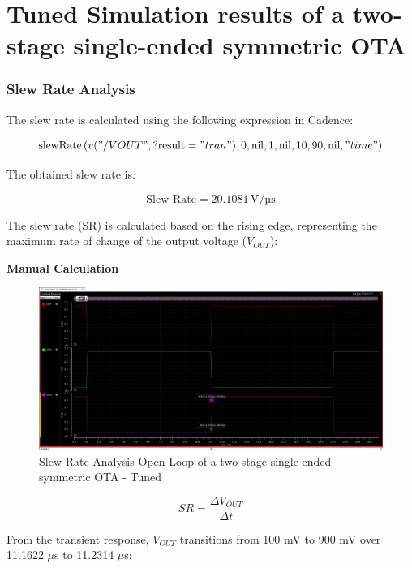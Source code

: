 \chapter{ Tuned Simulation results of a two-stage single-ended symmetric OTA}
\label{ch:chap}


\subsection{Slew Rate Analysis }
The slew rate is calculated using the following expression in Cadence:


\begin{equation}
\text{slewRate} \left( v("/VOUT", \text{?result} = "tran"), 0, \text{nil}, 1, \text{nil}, 10, 90, \text{nil}, "time" \right)
\end{equation}

The obtained slew rate is:

\begin{equation}
\text{Slew Rate} = 20.1081\, \text{V/µs}
\end{equation}

The slew rate (SR) is calculated based on the rising edge, representing the maximum rate of change of the output voltage ($V_{OUT}$):


\textbf{Manual Calculation}


    \begin{figure}[h]
        \centering
           \includegraphics[width=1\textwidth]{images/finetued_slew.png}
        \caption{Slew Rate Analysis Open Loop of a two-stage single-ended symmetric OTA - Tuned  }
        \label{fig: }
    \end{figure}

\begin{equation}
    SR = \frac{\Delta V_{OUT}}{\Delta t}
\end{equation}

From the transient response, $V_{OUT}$ transitions from 100 mV to 900 mV over 11.1622 $\mu$s to 11.2314 $\mu$s:

